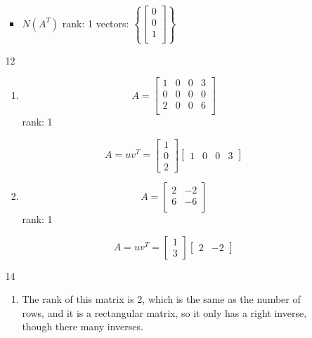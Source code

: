 \documentclass[12pt,letterpaper]{article}
\begin{document}
\begin{enumerate}[label=\S 2.\arabic*]
\begin{enumerate}
\begin{itemize}
            \item $N(A^T)$
              rank: 1
              vectors:
              $\left\{\begin{bmatrix}0 \\ 0 \\ 1 \\\end{bmatrix}\right\}$
          \end{itemize}
        \item [12]
          \begin{enumerate}
            \item
              \[
                A = \begin{bmatrix}
                  1 & 0 & 0 & 3 \\
                  0 & 0 & 0 & 0 \\
                  2 & 0 & 0 & 6 \\
                \end{bmatrix}
              \]
              rank: 1

              \[
                A = uv^T =
                \begin{bmatrix}
                  1 \\
                  0 \\
                  2
                \end{bmatrix}
                \begin{bmatrix}
                  1 & 0 & 0 & 3
                \end{bmatrix}
              \]

            \item
              \[
                A = \begin{bmatrix}
                  2 & -2 \\
                  6 & -6 \\
                \end{bmatrix}
              \]
              rank: 1

              \[
                A = uv^T =
                \begin{bmatrix}
                  1 \\
                  3
                \end{bmatrix}
                \begin{bmatrix}
                  2 & -2
                \end{bmatrix}
              \]
          \end{enumerate}
        \item [14]
          \begin{enumerate}
            \item
              The rank of this matrix is 2, which is the same as the number of rows, and it is a rectangular matrix, so it only has a right inverse, though there many inverses.


\end{enumerate}
\end{enumerate}
\end{enumerate}
\end{document}
